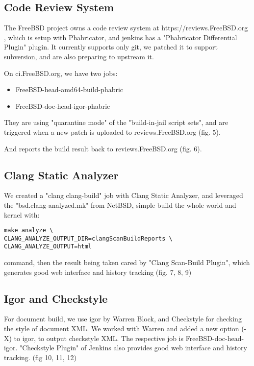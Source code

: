 \documentclass[a4paper,twocolumn,10pt]{article}
\begin{document}
\subsection{Code Review System}

The FreeBSD project owns a code review system at https://reviews.FreeBSD.org ,
which is setup with Phabricator, and jenkins has a "Phabricator Differential
Plugin" plugin. It currently supports only git, we patched it to support
subversion, and are also preparing to upstream it.

On ci.FreeBSD.org, we have two jobs:

\begin{itemize}
\item FreeBSD-head-amd64-build-phabric
\item FreeBSD-doc-head-igor-phabric
\end{itemize}

They are using "quarantine mode" of the "build-in-jail script sets", and are
triggered when a new patch is uploaded to reviews.FreeBSD.org (fig. 5).

And reports the build result back to reviews.FreeBSD.org (fig. 6).

\subsection{Clang Static Analyzer}

We created a "clang clang-build" job with Clang Static Analyzer, and leveraged
the "bsd.clang-analyzed.mk" from NetBSD, simple build the whole world and
kernel with:

\begin{lstlisting}
make analyze \
CLANG_ANALYZE_OUTPUT_DIR=clangScanBuildReports \
CLANG_ANALYZE_OUTPUT=html
\end{lstlisting}

command, then the result being taken cared by "Clang Scan-Build Plugin", which generates good web interface and history tracking (fig. 7, 8, 9)

\subsection{Igor and Checkstyle}

For document build, we use igor by Warren Block, and Checkstyle for checking
the style of document XML. We worked with Warren and added a new option (-X) to
igor, to output checkstyle XML. The respective job is FreeBSD-doc-head-igor.
"Checkstyle Plugin" of Jenkins also provides good web interface and history
tracking. (fig 10, 11, 12)
\end{document}
